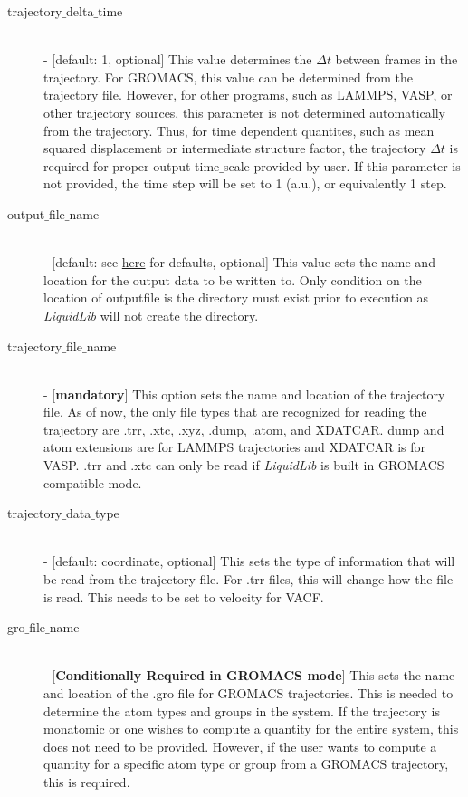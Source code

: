 \documentclass{article}
\begin{document}
\begin{description}
	\item[trajectory$\_$delta$\_$time] \hfill \\
	- [default: 1, optional] This value determines the $\Delta t$ between frames in the trajectory.  For GROMACS, this value can be determined from the trajectory file.  However, for other programs, such as LAMMPS, VASP, or other trajectory sources, this parameter is not determined automatically from the trajectory.  Thus, for time dependent quantites, such as mean squared displacement or intermediate structure factor, the trajectory $\Delta t$ is required for proper output time$\_$scale provided by user.  If this parameter is not provided, the time step will be set to 1 (a.u.), or equivalently 1 step. 
	
	\item[output$\_$file$\_$name] \hfill \\
	- [default: see \hyperref[input_output]{here} for defaults, optional] This value sets the name and location for the output data to be written to.  Only condition on the location of outputfile is the directory must exist prior to execution as \textit{LiquidLib} will not create the directory.
	
	\item[trajectory$\_$file$\_$name] \hfill \\
	- [\textbf{mandatory}] This option sets the name and location of the trajectory file.  As of now, the only file types that are recognized for reading the trajectory are .trr, .xtc, .xyz, .dump, .atom, and XDATCAR.  dump and atom extensions are for LAMMPS trajectories and XDATCAR is for VASP.  .trr and .xtc can only be read if \textit{LiquidLib} is built in GROMACS compatible mode.
	
	\item[trajectory$\_$data$\_$type] \hfill \\
	- [default: coordinate, optional] This sets the type of information that will be read from the trajectory file.  For .trr files, this will change how the file is read.  This needs to be set to velocity for VACF.  
	
	\item[gro$\_$file$\_$name] \hfill \\
	- [\textbf{Conditionally Required in GROMACS mode}] This sets the name and location of the .gro file for GROMACS trajectories.  This is needed to determine the atom types and groups in the system.  If the trajectory is monatomic or one wishes to compute a quantity for the entire system, this does not need to be provided.  However, if the user wants to compute a quantity for a specific atom type or group from a GROMACS trajectory, this is required.
	

\end{description}
\end{document}
